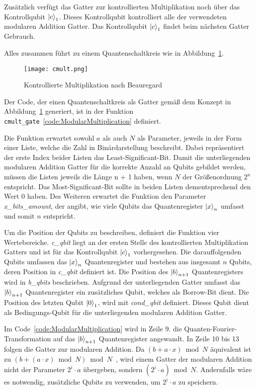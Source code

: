 Zusätzlich verfügt das Gatter zur kontrollierten Multiplikation noch über das Kontrollqubit \(\ket{c}_1\).
Dieses Kontrollqubit kontrolliert alle der verwendeten modularen Addition Gatter.
Das Kontrollqubit \(\ket{c}_1\) findet beim nächsten Gatter Gebrauch.

Alles zusammen führt zu einem Quantenschaltkreis wie in Abbildung~\ref{fig:cmult}.
\begin{figure}[H]
  \centering
  \texttt{[image: cmult.png]}
  \caption{Kontrollierte Multiplikation nach Beauregard~\cite{beauregard2003circuit}}
  \label{fig:cmult}
\end{figure}


\bigskip

Der Code, der einen Quantenschaltkreis als Gatter gemäß dem Konzept in Abbildung~\ref{fig:cmult} generiert, 
ist in der Funktion \texttt{cmult\_gate}~\ref{code:ModularMultiplication} definiert.

Die Funktion erwartet sowohl \(a\) als auch \(N\) als Parameter, 
jeweils in der Form einer Liste, welche die Zahl in Binärdarstellung beschreibt.
Dabei repräsentiert der erste Index beider Listen das Least-Significant-Bit.
Damit die unterliegenden modularen Addition Gatter für die korrekte Anzahl an Qubits gebildet werden, 
müssen die Listen jeweils die Länge n + 1 haben, wenn \(N\) der Größenordnung \(2^n\) entspricht.
Das Most-Significant-Bit sollte in beiden Listen dementsprechend den Wert \(0\) haben.
Des Weiteren erwartet die Funktion den Parameter \textit{x\_bits\_amount}, der angibt, 
wie viele Qubits das Quantenregister \(\ket{x}_n\) umfasst 
und somit \(n\) entspricht. 

Um die Position der Qubits zu beschreiben, 
definiert die Funktion vier Wertebereiche.
\textit{c\_qbit} liegt an der ersten Stelle des kontrollierten Multiplikation Gatters und 
ist für das Kontrollqubit \(\ket{c}_1\) vorhergesehen.
Die darauffolgenden Qubits umfassen das \(\ket{x}_n\) Quantenregister und bestehen aus insgesamt \(n\) Qubits, 
deren Position in \textit{c\_qbit} definiert ist.
Die Position des \(\ket{b}_{n+1}\) Quantenregisters wird in \textit{b\_qbits} beschrieben.
Aufgrund der unterliegenden Gatter umfasst das \(\ket{b}_{n+1}\) Quantenregister ein zusätzliches Qubit, 
welches als Borrow-Bit dient.
Die Position des letzten Qubit \(\ket{0}_1\), 
wird mit \textit{cond\_qbit} definiert.
Dieses Qubit dient als Bedingungs-Qubit für die unterliegenden modularen Addition Gatter.

Im Code~\ref{code:ModularMultiplication} wird in Zeile 9. die Quanten-Fourier-Transformation auf 
das \(\ket{b}_{n+1}\) Quantenregister angewandt.
In Zeile 10 bis 13 folgen die Gatter zur modularen Addition.
Da \((b + a \cdot x) \bmod N\) äquivalent ist zu \((b + (a \cdot x)\bmod N) \bmod N\)~\cite{koepf_modular_2021}, 
wird einem Gatter der modularen Addition nicht der Parameter \(2^i\cdot a\) übergeben, 
sondern \((2^i\cdot a)\bmod N\).
Andernfalls wäre es notwendig, 
zusätzliche Qubits zu verwenden, um \(2^i\cdot a\) zu speichern.

